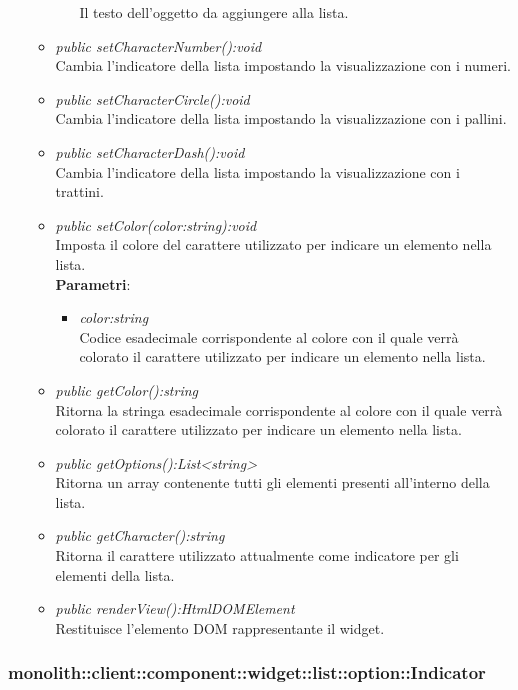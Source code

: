 \begin{itemize}
\begin{itemize}
\begin{itemize}
		Il testo dell'oggetto da aggiungere alla lista.
		\end{itemize} 
	\item \textit{public setCharacterNumber():void}\\
	Cambia l'indicatore della lista impostando la visualizzazione con i numeri.
	\item \textit{public setCharacterCircle():void}\\
	Cambia l'indicatore della lista impostando la visualizzazione con i pallini.
	\item \textit{public setCharacterDash():void}\\
	Cambia l'indicatore della lista impostando la visualizzazione con i trattini.
	\item \textit{public setColor(color:string):void}\\
		Imposta il colore del carattere utilizzato per indicare un elemento nella lista.
		\\ \textbf{Parametri}: \begin{itemize}
		\item \textit{color:string}\\
		Codice esadecimale corrispondente al colore con il quale verrà colorato il carattere utilizzato per indicare un elemento nella lista.
		\end{itemize} 
	\item \textit{public getColor():string}\\
	Ritorna la stringa esadecimale corrispondente al colore con il quale verrà colorato il carattere utilizzato per indicare un elemento nella lista.
	\item \textit{public getOptions():List<string>}\\
	Ritorna un array contenente tutti gli elementi presenti all'interno della lista.
	\item \textit{public getCharacter():string}\\
	Ritorna il carattere utilizzato attualmente come indicatore per gli elementi della lista.
	\item \textit{public renderView():HtmlDOMElement}\\
	Restituisce l'elemento DOM rappresentante il widget.
	\end{itemize}
\end{itemize}

\subsubsection{monolith::client::component::widget::list::option::Indicator}

